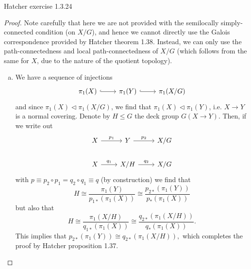\documentclass{../../mathnotes}
\begin{document}
\begin{prop}
    Hatcher exercise 1.3.24
\end{prop}
\begin{proof}
    Note carefully that here we are not provided with the semilocally simply-connected condition (on $X/G$), and hence we
    cannot directly use the Galois correspondence provided by Hatcher theorem 1.38. Instead, we can only
    use the path-connectedness and local path-connectedness of $X/G$ (which follows from the same for $X$, due
    to the nature of the quotient topology).
    \begin{enumerate}[(a)]
        \item We have a sequence of injections
            \begin{equation*}
                \begin{tikzcd}
                    \pi_1(X)\arrow[hook]{r}&\pi_1(Y)\arrow[hook]{r}&\pi_1(X/G)
                \end{tikzcd}
            \end{equation*}
            and since $\pi_1(X)\lhd \pi_1(X/G)$, we find that $\pi_1(X)\lhd \pi_1(Y)$, i.e. $X\to Y$ is a normal covering.
            Denote by $H\leq G$ the deck group $G(X\to Y)$. Then, if we write out
            \begin{equation*}
                \begin{tikzcd}
                    X\arrow{r}{p_1}& Y\arrow{r}{p_2}& X/G\\
                    X\arrow{r}{q_1}& X/H\arrow{r}{q_2}& X/G
                \end{tikzcd}
            \end{equation*}
            with $p\equiv p_2\circ p_1=q_2\circ q_1\equiv q$ (by construction) we find that
            \[ H\cong \frac{\pi_1(Y)}{p_{1*}(\pi_1(X))}\cong \frac{p_{2*}(\pi_1(Y))}{p_*(\pi_1(X))} \]
            but also that
            \[ H\cong \frac{\pi_1(X/H)}{q_{1*}(\pi_1(X))}\cong\frac{q_{2*}(\pi_1(X/H))}{q_*(\pi_1(X))}. \]
            This implies that $p_{2*}(\pi_1(Y))\cong q_{2*}(\pi_1(X/H)),$ which completes the proof by Hatcher proposition 1.37.

\end{enumerate}
\end{proof}
\end{document}
